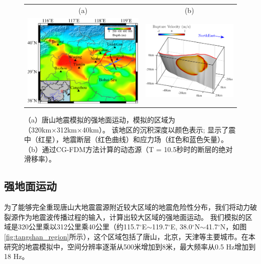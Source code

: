 \documentclass[degree=doctor]{thuthesis}
\begin{document}
\begin{figure}[t]
\begin{tabular}{cc}
(a) & (b) \\
    \includegraphics[width=0.5\columnwidth]{Tangshan_geomap.eps} &
    \includegraphics[width=0.5\columnwidth]{Tangshan_Fault1.eps}
\end{tabular}
    \caption{
（a）唐山地震模拟的强地面运动，模拟的区域为（320km×312km×40km）。 该地区的沉积深度以颜色表示; 显示了震中（红星），地震断层（红色曲线）和应力场（红色和蓝色矢量）。 （b）通过CG-FDM方法计算的动态源（T = 10.5秒时的断层的绝对滑移率）。}
    \label{fig:tangshan_geomap}
\end{figure}


\subsection{强地面运动}

为了能够完全重现唐山大地震震源附近较大区域的地震危险性分布，我们将动力破裂源作为地震波传播过程的输入，计算出较大区域的强地面运动。 我们模拟的区域是320公里乘以312公里乘40公里（约115.7$^\circ$E$\sim$119.7$^\circ$E, 38.0$^\circ$N$\sim$41.7$^\circ$N，如图\ref{fig:tangshan_region}所示），这个区域包括了唐山，北京，天津等主要城市。在本研究的地震模拟中，空间分辨率逐渐从500米增加到8米，最大频率从0.5 Hz增加到18 Hz。
\end{document}
